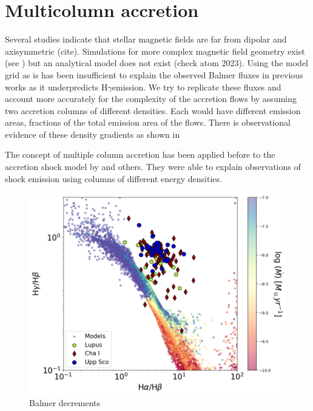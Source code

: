 \documentclass[twocolumn,linenumbers]{aastex631}
\newcommand{\hgamma}{H$\gamma$}
\begin{document}
\section{Multicolumn accretion}


Several studies indicate that stellar magnetic fields are far from dipolar and axisymmetric (cite). Simulations for more complex magnetic field geometry exist (see \citet{romanova2003}) but an analytical model does not exist (check atom 2023). Using the model grid as is has been insufficient to explain the observed Balmer fluxes in previous works \citep{micolta2023} as it underpredicts \hgamma emission. We try to replicate these fluxes and account more accurately for the complexity of the accretion flows by assuming two accretion columns of different densities. Each would have different emission areas, fractions of the total emission area of the flows. There is observational evidence of these density gradients as shown in \citet{zhaohuan2024}

 The concept of multiple column accretion has been applied before to the accretion shock model by \citet{pittman2022} and others. They were able to explain observations of shock emission using columns of different energy densities. 

\begin{figure}
    \centering
    \includegraphics[width=0.8\linewidth]{figures/BalmerDecrements.png}
    \caption{Balmer decrements}
    \label{fig:balmer_decrement}
\end{figure}
\end{document}
